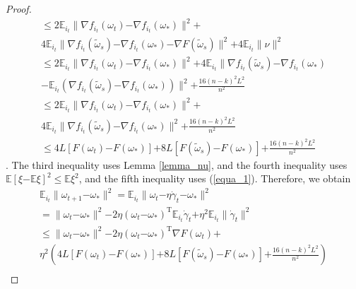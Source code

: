 \documentclass[letterpaper]{article}
\begin{document}
\begin{proof}
\begin{equation}
\begin{array}{ll}
\le 2\mathbb{E}_{i_t} \parallel \nabla f_{i_{t}}(\omega_{t}) \mathrm{-} \nabla f_{i_{t}}(\omega_{\ast}) \parallel^2  \mathrm{+} \\
4 \mathbb{E}_{i_t} \parallel  \nabla f_{i_{t}}(\tilde{\omega}_{s}) \mathrm{-} \nabla f_{i_{t}}(\omega_{\ast}) \mathrm{-} \nabla F(\tilde{\omega}_s) \parallel^2 \mathrm{+} 4\mathbb{E}_{i_t} \parallel \nu  \parallel^2 \\ 
\le 2\mathbb{E}_{i_t} \parallel \nabla f_{i_{t}}(\omega_{t}) \mathrm{-} \nabla f_{i_{t}}(\omega_{\ast}) \parallel^2  \mathrm{+} 4 \mathbb{E}_{i_t} \parallel  \nabla f_{i_{t}}(\tilde{\omega}_{s}) \mathrm{-} \nabla f_{i_{t}}(\omega_{\ast}) \\
\mathrm{-} \mathbb{E}_{i_t} \left ( \nabla f_{i_t}(\tilde{\omega}_s) \mathrm{-} \nabla f_{i_t}(\omega_\ast)   \right)\parallel^2   \mathrm{+} \frac{16(n-k)^2L^2}{n^2}   \\ 
\le 2\mathbb{E}_{i_t} \parallel \nabla f_{i_{t}}(\omega_{t}) \mathrm{-} \nabla f_{i_{t}}(\omega_{\ast}) \parallel^2  \mathrm{+} \\
4 \mathbb{E}_{i_t} \parallel  \nabla f_{i_{t}}(\tilde{\omega}_{s}) \mathrm{-} \nabla f_{i_{t}}(\omega_{\ast}) \parallel^2 \mathrm{+} \frac{16(n-k)^2L^2}{n^2} \\
\le 4L [F(\omega_t)\mathrm{-}F(\omega_\ast)] \mathrm{+}  8L [F(\tilde{\omega}_s)\mathrm{-}F(\omega_\ast)] \mathrm{+} \frac{16(n-k)^2L^2}{n^2}
\end{array} 
\end{equation}.  The third inequality uses Lemma \ref{lemma_nu},  and the fourth inequality uses $\mathbb{E}[\xi\mathrm{-}\mathbb{E}\xi]^2 \le \mathbb{E}\xi^2$, and the fifth inequality uses (\ref{equa_1}). Therefore, we obtain 
\begin{equation}
\begin{array}{ll}
\mathbb{E}_{i_t}\parallel  \omega_{t+1}\mathrm{-}\omega_\ast \parallel^2 = \mathbb{E}_{i_t}\parallel  \omega_{t}\mathrm{-}\eta\dot{\gamma}_t\mathrm{-}\omega_\ast \parallel^2\\
=\parallel  \omega_{t}\mathrm{-}\omega_\ast  \parallel^2  \mathrm{-}2\eta(\omega_t\mathrm{-}\omega_\ast)^\mathrm{T}\mathbb{E}_{i_t}\dot{\gamma}_{t}  \mathrm{+}  \eta^2 \mathbb{E}_{i_t}\parallel  \dot{\gamma}_{t}  \parallel^2  \\
\le \parallel  \omega_{t}\mathrm{-}\omega_\ast  \parallel^2  \mathrm{-}2\eta(\omega_t\mathrm{-}\omega_\ast)^\mathrm{T}\nabla F(\omega_t) \mathrm{+} \\
\eta^2 \left(  4L [F(\omega_t)\mathrm{-}F(\omega_\ast)] \mathrm{+} 8L [F(\tilde{\omega}_s)\mathrm{-}F(\omega_\ast)] \mathrm{+} \frac{16(n-k)^2L^2}{n^2} \right)  \\ 

\end{array}
\end{equation}
\end{proof}
\end{document}
